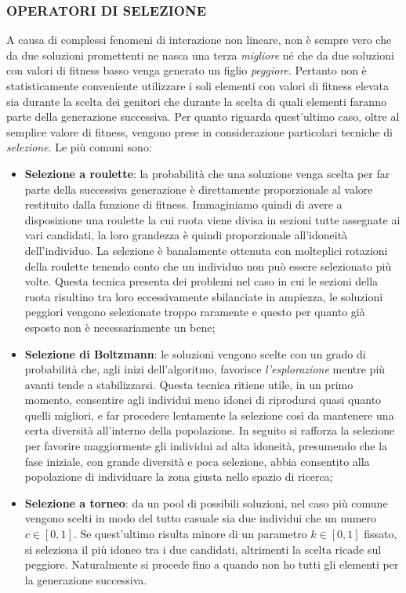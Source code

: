 \documentclass[11pt]{article}
\begin{document}
\subsubsection*{OPERATORI DI SELEZIONE}
\label{sec:OpSelezioneS}

A causa di complessi fenomeni di interazione non lineare, non è sempre vero che da due soluzioni promettenti ne nasca una terza \textit{migliore} né che da due soluzioni con valori di fitness basso venga generato un figlio \textit{peggiore}. Pertanto non è statisticamente conveniente utilizzare i soli elementi con valori di fitness elevata sia durante la scelta dei genitori che durante la scelta di quali elementi faranno parte della generazione successiva. Per quanto riguarda quest'ultimo caso, oltre al semplice valore di fitness, vengono prese in considerazione particolari tecniche di \textit{selezione}. Le più comuni sono:

\begin{itemize}
    \item \textbf{Selezione a roulette}: la probabilità che una soluzione venga scelta per far parte della successiva generazione è direttamente proporzionale al valore restituito dalla funzione di fitness. Immaginiamo quindi di avere a disposizione una roulette la cui ruota viene divisa in sezioni tutte assegnate ai vari candidati, la loro grandezza è quindi proporzionale all'idoneità dell'individuo. La selezione è banalamente ottenuta con molteplici rotazioni della roulette tenendo conto che un individuo non può essere selezionato più volte. Questa tecnica presenta dei problemi nel caso in cui le sezioni della ruota risultino tra loro eccessivamente sbilanciate in ampiezza, le soluzioni peggiori vengono selezionate troppo raramente e questo per quanto già esposto non è necessariamente un bene;
    
    \item \textbf{Selezione di Boltzmann}: le soluzioni vengono scelte con un grado di probabilità che, agli inizi dell'algoritmo, favorisce \textit{l'esplorazione} mentre più avanti tende a stabilizzarsi. Questa tecnica ritiene utile, in un primo momento, consentire agli individui meno idonei di riprodursi quasi quanto quelli migliori, e far procedere lentamente la selezione così da mantenere una certa diversità all'interno della popolazione. In seguito si rafforza la selezione per favorire maggiormente gli individui ad alta idoneità, presumendo che la fase iniziale, con grande diversità e poca selezione, abbia consentito alla popolazione di individuare la zona giusta nello spazio di ricerca;
    
    \item \textbf{Selezione a torneo}: da un pool di possibili soluzioni, nel caso più comune vengono scelti in modo del tutto casuale sia due individui che un numero $c \in [0, 1]$. Se quest'ultimo risulta minore di un parametro $k \in [0, 1]$ fissato, si seleziona il più idoneo tra i due candidati, altrimenti la scelta ricade sul peggiore. Naturalmente si procede fino a quando non ho tutti gli elementi per la generazione successiva.
\end{itemize}
\end{document}
